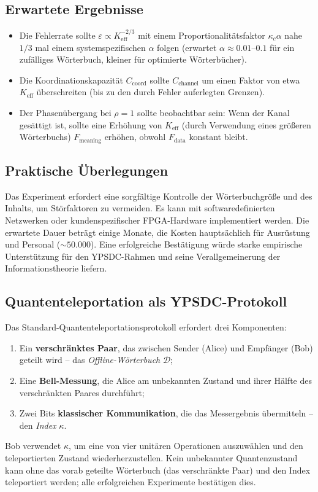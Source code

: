 \documentclass[12pt,a4paper]{article}
\theoremstyle{remark}
\newcommand{\Keff}{K_{\mathrm{eff}}}
\begin{document}
	\subsection{Erwartete Ergebnisse}
	
	\begin{itemize}
		\item Die Fehlerrate sollte $\varepsilon \propto K_{\mathrm{eff}}^{-2/3}$ mit einem Proportionalitätsfaktor $\kappa_c \alpha$ nahe $1/3$ mal einem systemspezifischen $\alpha$ folgen (erwartet $\alpha \approx 0.01$–$0.1$ für ein zufälliges Wörterbuch, kleiner für optimierte Wörterbücher).
		\item Die Koordinationskapazität $C_{\text{coord}}$ sollte $C_{\text{channel}}$ um einen Faktor von etwa $\Keff$ überschreiten (bis zu den durch Fehler auferlegten Grenzen).
		\item Der Phasenübergang bei $\rho=1$ sollte beobachtbar sein: Wenn der Kanal gesättigt ist, sollte eine Erhöhung von $\Keff$ (durch Verwendung eines größeren Wörterbuchs) $F_{\text{meaning}}$ erhöhen, obwohl $F_{\text{data}}$ konstant bleibt.
	\end{itemize}
	
	\subsection{Praktische Überlegungen}
	
	Das Experiment erfordert eine sorgfältige Kontrolle der Wörterbuchgröße und des Inhalts, um Störfaktoren zu vermeiden. Es kann mit softwaredefinierten Netzwerken oder kundenspezifischer FPGA-Hardware implementiert werden. Die erwartete Dauer beträgt einige Monate, die Kosten hauptsächlich für Ausrüstung und Personal ($\sim 50.000$). Eine erfolgreiche Bestätigung würde starke empirische Unterstützung für den YPSDC-Rahmen und seine Verallgemeinerung der Informationstheorie liefern.
	
	\subsection{Quantenteleportation als YPSDC-Protokoll}
	\label{subsec:qt}
	
	Das Standard-Quantenteleportationsprotokoll erfordert drei Komponenten:
	\begin{enumerate}
		\item Ein \textbf{verschränktes Paar}, das zwischen Sender (Alice) und Empfänger (Bob) geteilt wird – das \emph{Offline-Wörterbuch} $\mathcal{D}$;
		\item Eine \textbf{Bell-Messung}, die Alice am unbekannten Zustand und ihrer Hälfte des verschränkten Paares durchführt;
		\item Zwei Bits \textbf{klassischer Kommunikation}, die das Messergebnis übermitteln – den \emph{Index} $\kappa$.
	\end{enumerate}
	Bob verwendet $\kappa$, um eine von vier unitären Operationen auszuwählen und den teleportierten Zustand wiederherzustellen. Kein unbekannter Quantenzustand kann ohne das vorab geteilte Wörterbuch (das verschränkte Paar) und den Index teleportiert werden; alle erfolgreichen Experimente bestätigen dies.
	
\end{document}
